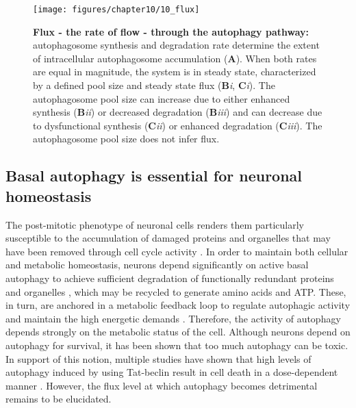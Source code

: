 \begin{figure}[h!]
  \center
  \texttt{[image: figures/chapter10/10\_flux]}
  \caption[Flux - the rate of flow - through the autophagy pathway]{\textbf{Flux - the rate of flow - through the autophagy pathway:} autophagosome synthesis and degradation rate determine the extent of intracellular autophagosome accumulation (\textbf{A}). When both rates are equal in magnitude, the system is in steady state, characterized by a defined pool size and steady state flux (\textbf{B}\textit{i}, \textbf{C}\textit{i}). The autophagosome pool size can increase due to either enhanced synthesis (\textbf{B}\textit{ii}) or decreased degradation (\textbf{B}\textit{iii}) and can decrease due to dysfunctional synthesis (\textbf{C}\textit{ii}) or enhanced degradation (\textbf{C}\textit{iii}). The autophagosome pool size does not infer flux. }
  \label{fig:10_flux}
\end{figure}

\subsection{Basal autophagy is essential for neuronal homeostasis}
The post-mitotic phenotype of neuronal cells renders them particularly susceptible to the accumulation of damaged proteins and organelles that may have been removed through cell cycle activity \citep{Liang2014,Tan2014}. In order to maintain both cellular and metabolic homeostasis, neurons depend significantly on active basal autophagy to achieve sufficient degradation of functionally redundant proteins and organelles \citep{Meijer2009}, which may be recycled to generate amino acids and ATP. These, in turn, are anchored in a metabolic feedback loop to regulate autophagic activity and maintain the high energetic demands \citep{Loos2013}. Therefore, the activity of autophagy depends strongly on the metabolic status of the cell. Although neurons depend on autophagy for survival, it has been shown that too much autophagy can be toxic. In support of this notion, multiple studies have shown that high levels of autophagy induced by using Tat-beclin result in cell death in a dose-dependent manner \citep{Liu2013,Liu2015}. However, the flux level at which autophagy becomes detrimental remains to be elucidated. 

